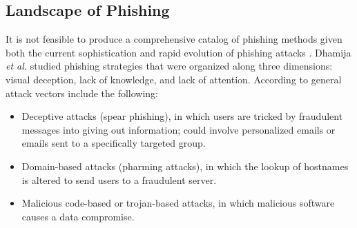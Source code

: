 \documentclass[english,gradu]{tktltiki}
\begin{document}



\subsection{Landscape of Phishing} %
\label{sub:landscape_of_phishing}

              It is not feasible to produce a comprehensive catalog of phishing methods given both the current sophistication and rapid evolution of phishing attacks \cite{phishing_attacks_and_solutions_2007}. Dhamija
          \emph{et al.} \cite{why_phishing_works_06} studied phishing strategies that were organized along three dimensions: visual deception, lack of knowledge, and lack of attention. According to \cite{phishing_attacks_and_solutions_2007, suspectibility_to_phishing_2006} general attack vectors include the following:

          \begin{itemize}

            \item{Deceptive attacks (spear phishing),
                      in which users are tricked by fraudulent messages into giving out
                      information; could involve personalized emails or emails sent to a specifically
                      targeted group.
                    }

            \item{Domain-based attacks (pharming attacks),
                      in which the lookup of hostnames is altered to send users to a
                      fraudulent server.
                    }

            \item{Malicious code-based or trojan-based attacks,
                        in which malicious software causes a data compromise.
                    }

          \end{itemize}
\end{document}
